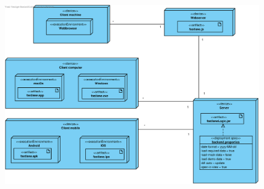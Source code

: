 \begin{landscape}
    \begin{figure}[H]
        \centering
        \includegraphics[width = 1.4\textwidth]{pictures/Fastlane_Deployment_Diagram}
        \label{fig:anhang_deploymentdiagramm}
    \end{figure}
\end{landscape}